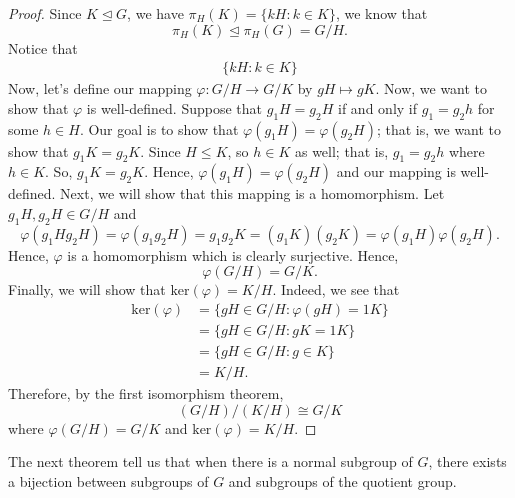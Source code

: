 \begin{proof}
    Since \( K \trianglelefteq G  \), we have \( \pi_{H}(K) = \{  k H : k \in K  \}   \), we know that \[ {\pi}_{H}(K) \trianglelefteq \pi_H(G) = G / H.   \]
    Notice that 
    \begin{align*}
    \{  k H : k \in K  \}
    \end{align*}
    Now, let's define our mapping \( \varphi : G /  H \longrightarrow G / K  \) by \( g H \mapsto g K  \). Now, we want to show that \( \varphi  \) is well-defined. Suppose that \( {g}_{1} H  = {g}_{2} H  \) if and only if \( {g}_{1} = {g}_{2} h  \) for some \( h \in H  \). Our goal is to show that \( \varphi({g}_{1}H) = \varphi({g}_{2}H) \); that is, we want to show that \( {g}_{1} K = {g}_{2} K  \). Since \( H \leq K  \), so \( h \in K  \) as well; that is, \( {g}_{1} = {g}_{2} h  \) where \( h \in K  \). So, \( {g}_{1} K = {g}_{2} K  \). Hence, \( \varphi({g}_{1}H) = \varphi({g}_{2}H) \) and our mapping is well-defined. Next, we will show that this mapping is a homomorphism. Let \( {g}_{1}H , {g}_{2}H \in G / H  \) and  
    \[ \varphi({g}_{1}H {g}_{2}H) = \varphi({g}_{1} {g}_{2} H ) = {g}_{1} {g}_{2} K  = ({g}_{1} K) ({g}_{2} K ) = \varphi({g}_{1}H) \varphi({g}_{2}H). \]
    Hence, \( \varphi  \) is a homomorphism which is clearly surjective. Hence,  
    \[  \varphi(G / H ) = G / K.  \]
    Finally, we will show that \( \text{ker}(\varphi) = K /  H \). Indeed, we see that 
    \begin{align*}
        \text{ker}(\varphi) &= \{  gH \in G / H  : \varphi(gH) = 1K  \}   \\
                            &= \{  gH \in G / H : gK  = 1K   \}  \\
                            &= \{  g H \in G /H  : g \in K  \} \\
                            &= K / H. 
    \end{align*}
    Therefore, by the first isomorphism theorem, 
    \[  (G / H) / (K / H ) \cong G / K  \]
    where \( \varphi(G / H ) = G / K  \) and \( \text{ker}(\varphi) = K / H  \).
\end{proof}

The next theorem tell us that when there is a normal subgroup of \( G  \), there exists a bijection between subgroups of \( G  \) and subgroups of the quotient group.

